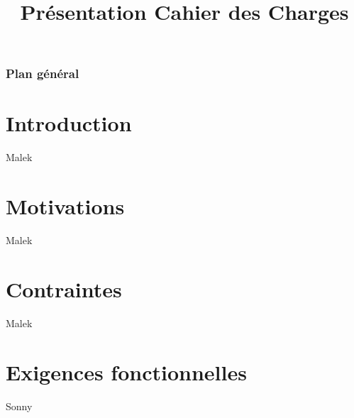 
\usepackage{../tex/myInfolines}
\usepackage{longtable,array}
\title{Présentation Cahier des Charges}



	\begin{frame}
		\titlepage
	\end{frame}
	
	\begin{frame}
		\frametitle{Plan général}
		\tableofcontents
	\end{frame}
	
	\section{Introduction}
	\begin{frame}
		Malek
	\end{frame}
	
	\section{Motivations}
	\begin{frame}
		Malek
	\end{frame}	
	
	\section{Contraintes}
	\begin{frame}
		Malek
	\end{frame}
	
	\section{Exigences fonctionnelles}
	\begin{frame}
		Sonny
	\end{frame}
	
